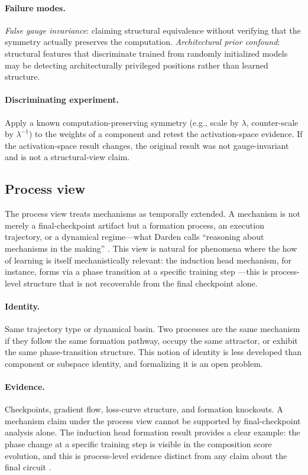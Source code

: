 \documentclass{article}
\begin{document}
\paragraph{Failure modes.}
\emph{False gauge invariance}: claiming structural equivalence without
verifying that the symmetry actually preserves the computation.
\emph{Architectural prior confound}: structural features that
discriminate trained from randomly initialized models may be detecting
architecturally privileged positions rather than learned structure.

\paragraph{Discriminating experiment.}
Apply a known computation-preserving symmetry (e.g., scale by $\lambda$,
counter-scale by $\lambda^{-1}$) to the weights of a component and
retest the activation-space evidence.  If the activation-space result
changes, the original result was not gauge-invariant and is not a
structural-view claim.

\subsection{Process view}

The process view treats mechanisms as temporally extended.  A mechanism
is not merely a final-checkpoint artifact but a formation process, an
execution trajectory, or a dynamical regime---what Darden calls
``reasoning about mechanisms in the making'' \citep{darden2006}.  This
view is natural for phenomena where the how of learning is itself
mechanistically relevant:
the induction head mechanism, for instance, forms via a phase transition
at a specific training step \citep{olsson2022}---this is process-level
structure that is not recoverable from the final checkpoint alone.

\paragraph{Identity.}
Same trajectory type or dynamical basin.  Two processes are the same
mechanism if they follow the same formation pathway, occupy the same
attractor, or exhibit the same phase-transition structure.  This notion
of identity is less developed than component or subspace identity, and
formalizing it is an open problem.

\paragraph{Evidence.}
Checkpoints, gradient flow, loss-curve structure, and formation knockouts.
A mechanism claim under the process view cannot be supported by
final-checkpoint analysis alone.  The induction head formation result
provides a clear example: the phase change at a specific training step
is visible in the composition score evolution, and this is process-level
evidence distinct from any claim about the final circuit \citep{olsson2022}.
\end{document}

